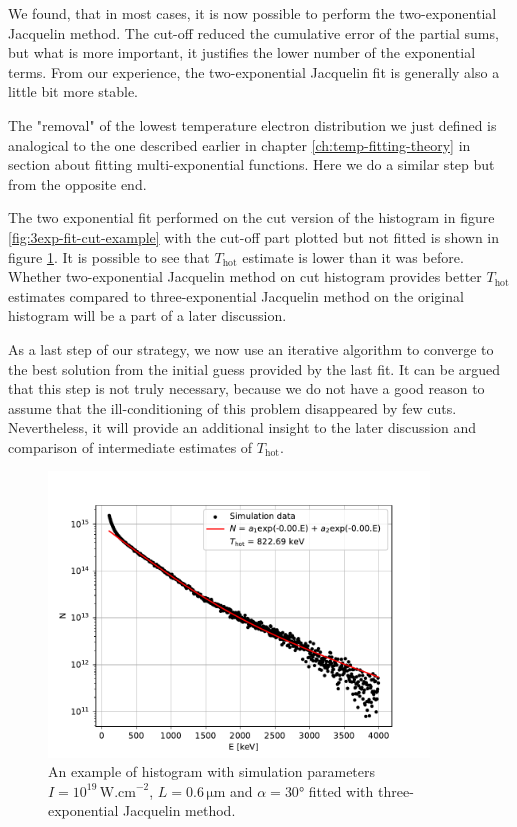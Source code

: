 We found, that in most cases, it is now possible to perform the two-exponential Jacquelin method. The cut-off reduced the cumulative error of the partial sums, but what is more important, it justifies the lower number of the exponential terms. From our experience, the two-exponential Jacquelin fit is generally also a little bit more stable. 

The "removal" of the lowest temperature electron distribution we just defined is analogical to the one described earlier in chapter \ref{ch:temp-fitting-theory} in section about fitting multi-exponential functions. Here we do a similar step but from the opposite end.

The two exponential fit performed on the cut version of the histogram in figure \ref{fig:3exp-fit-cut-example} with the cut-off part plotted but not fitted is shown in figure \ref{fig:2exp-fit-example}. It is possible to see that $T_{\mathrm{hot}}$ estimate is lower than it was before. Whether two-exponential Jacquelin method on cut histogram provides better $T_{\mathrm{hot}}$ estimates compared to three-exponential Jacquelin method on the original histogram will be a part of a later discussion.

As a last step of our strategy, we now use an iterative algorithm to converge to the best solution from the initial guess provided by the last fit. It can be argued that this step is not truly necessary, because we do not have a good reason to assume that the ill-conditioning of this problem disappeared by few cuts. Nevertheless, it will provide an additional insight to the later discussion and comparison of intermediate estimates of $T_{\mathrm{hot}}$.
\begin{figure}[t]
	\centering
	\includegraphics[width=0.9\textwidth]{figures/hist_1e19_060_30_2exp}
	\caption{An example of histogram with simulation parameters $I=10^{19}\,\mathrm{W.cm}^{-2}$, $L=0.6\,\mathrm{\mu m}$ and $\alpha = 30$° fitted with three-exponential Jacquelin method.}
	\label{fig:2exp-fit-example}
\end{figure}



